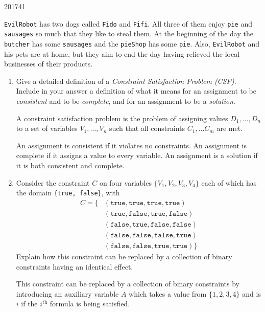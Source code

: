 \documentclass[10pt,\jkfside,a4paper]{article}
\begin{document}
\begin{examquestion}{2017}{4}{1}

\texttt{EvilRobot} has two dogs called \texttt{Fido} and \texttt{Fifi}. All
three of them enjoy \texttt{pie} and \texttt{sausages} so much that they
like to steal them. At the beginning of the day the \texttt{butcher} has some
\texttt{sausages} and the \texttt{pieShop} has some \texttt{pie}. Also,
\texttt{EvilRobot} and his pets are at home, but they aim to end the day
having relieved the local businesses of their products.

\begin{enumerate}[label=(\alph*)]

\item Give a detailed definition of a \textit{Constraint Satisfaction
Problem (CSP)}. Include in your answer a definition of what it means for an
assignment to be \textit{consistent} and to be \textit{complete}, and for an
assignment to be a \textit{solution}.

A constraint satisfaction problem is the problem of assigning values $D_1,
\dots, D_n$ to a set of variables $V_1, \dots, V_n$ such that all
constraints $C_1, \dots C_m$ are met.

An assignment is consistent if it violates no constraints. An assignment is
complete if it assigns a value to every variable. An assignment is a
solution if it is both consistent and complete.

\item Consider the constraint $C$ on four variables $\{V_1, V_2, V_3, V_4\}$
each of which has the domain \texttt{\{true, false\}}, with
\[
\begin{split}
C = \{
&(\texttt{true}, \texttt{true}, \texttt{true}, \texttt{true})\\
&(\texttt{true}, \texttt{false}, \texttt{true}, \texttt{false})\\
&(\texttt{false}, \texttt{true}, \texttt{false}, \texttt{false})\\
&(\texttt{false}, \texttt{false}, \texttt{false}, \texttt{true})\\
&(\texttt{false}, \texttt{false}, \texttt{true}, \texttt{true})\}
\end{split}
\]
Explain how this constraint can be replaced by a collection of binary
constraints having an identical effect.

This constraint can be replaced by a collection of binary constraints by
introducing an auxiliary variable $A$ which takes a value from $\{1, 2, 3,
4\}$ and is $i$ if the $i^{\text{th}}$ formula is being satisfied.


\end{enumerate}
\end{examquestion}
\end{document}
